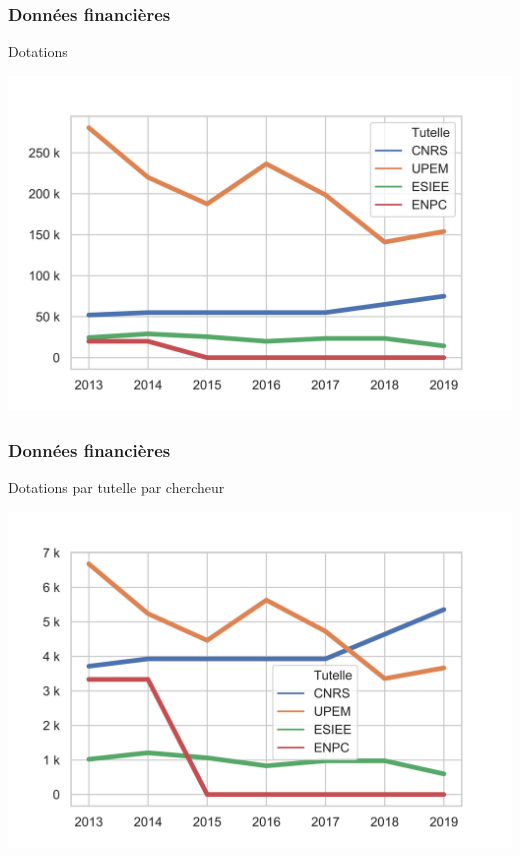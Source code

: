 \documentclass[]{beamer}
\begin{document}
\begin{frame}[fragile]
  \frametitle{Données financières}

  \begin{block}{Dotations}
    \begin{center}
      \includegraphics[scale=.7]{pictures/dotations.png}
    \end{center}
  \end{block}

\end{frame}


\begin{frame}[fragile]
  \frametitle{Données financières}

  \begin{block}{Dotations par tutelle par chercheur}
    \begin{center}
      \includegraphics[scale=.7]{pictures/dotations-par-chercheur.png}
    \end{center}
  \end{block}

\end{frame}
\end{document}

